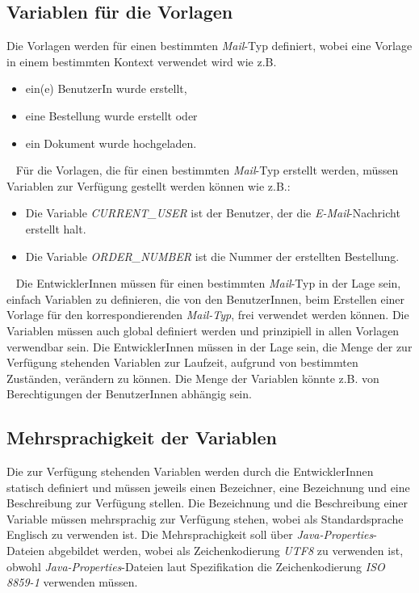 \subsection{Variablen für die Vorlagen}
Die Vorlagen werden für einen bestimmten \emph{Mail}-Typ definiert, wobei eine Vorlage in einem bestimmten Kontext verwendet wird wie z.B.
\begin{itemize}
	\item ein(e) BenutzerIn wurde erstellt,
	\item eine Bestellung wurde erstellt oder
	\item ein Dokument wurde hochgeladen.
\end{itemize}
\ \newline
Für die Vorlagen, die für einen bestimmten \emph{Mail}-Typ erstellt werden, müssen Variablen zur Verfügung gestellt werden können wie z.B.:
\begin{itemize}
	\item Die Variable \emph{CURRENT\_USER} ist der Benutzer, der die \emph{E-Mail}-Nachricht erstellt halt.
	\item Die Variable \emph{ORDER\_NUMBER} ist die Nummer der erstellten Bestellung.
\end{itemize}
\ \newline
Die EntwicklerInnen müssen für einen bestimmten \emph{Mail}-Typ in der Lage sein, einfach Variablen zu definieren, die von den BenutzerInnen, beim Erstellen einer Vorlage für den korrespondierenden \emph{Mail-Typ}, frei verwendet werden können. Die Variablen müssen auch global definiert werden und prinzipiell in allen Vorlagen verwendbar sein. Die EntwicklerInnen müssen in der Lage sein, die Menge der zur Verfügung stehenden Variablen zur Laufzeit, aufgrund von bestimmten Zuständen, verändern zu können. Die Menge der Variablen könnte z.B. von Berechtigungen der BenutzerInnen abhängig sein.

\subsection{Mehrsprachigkeit der Variablen}
Die zur Verfügung stehenden Variablen werden durch die EntwicklerInnen statisch definiert und müssen jeweils einen Bezeichner, eine Bezeichnung und eine Beschreibung zur Verfügung stellen. Die Bezeichnung und die Beschreibung einer Variable müssen mehrsprachig zur Verfügung stehen, wobei als Standardsprache Englisch zu verwenden ist. Die Mehrsprachigkeit soll über \emph{Java-Properties}-Dateien abgebildet werden, wobei als Zeichenkodierung \emph{UTF8} zu verwenden ist, obwohl \emph{Java-Properties}-Dateien laut Spezifikation die Zeichenkodierung \emph{ISO 8859-1} verwenden müssen.

